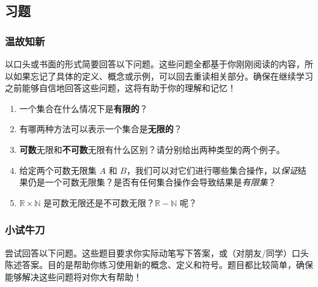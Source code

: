 
\subsection{习题}\label{sec:section7.6.5}

\subsubsection*{温故知新}

以口头或书面的形式简要回答以下问题。这些问题全都基于你刚刚阅读的内容，所以如果忘记了具体的定义、概念或示例，可以回去重读相关部分。确保在继续学习之前能够自信地回答这些问题，这将有助于你的理解和记忆！

\begin{enumerate}[label=(\arabic*)]
    \item 一个集合在什么情况下是\textbf{有限的}？
    \item 有哪两种方法可以表示一个集合是\textbf{无限的}？
    \item \textbf{可数}无限和\textbf{不可数}无限有什么区别？请分别给出两种类型的两个例子。
    \item 给定两个可数无限集 $A$ 和 $B$，我们可以对它们进行哪些集合操作，以\emph{保证}结果仍是一个可数无限集？是否有任何集合操作会导致结果是\emph{有限集}？
    \item $\mathbb{R} \times \mathbb{N}$ 是可数无限还是不可数无限？$\mathbb{R} - \mathbb{N}$ 呢？
\end{enumerate}

\subsubsection*{小试牛刀}

尝试回答以下问题。这些题目要求你实际动笔写下答案，或（对朋友/同学）口头陈述答案。目的是帮助你练习使用新的概念、定义和符号。题目都比较简单，确保能够解决这些问题将对你大有帮助！

